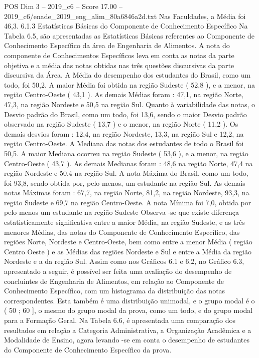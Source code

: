 \begin{textsample}{POS Dim 3 – 2019\_c6 – Score 17.00 – 2019\_c6/enade\_2019\_eng\_alim\_80a6846a2d.txt}
Nas Faculdades, a Média foi 46,3. 6.1.3 Estatísticas Básicas do Componente de Conhecimento Específico Na Tabela 6.5, são apresentadas as Estatísticas Básicas referentes ao Componente de Conhecimento Específico da área de Engenharia de Alimentos.
A nota do componente de Conhecimentos Específicos leva em conta as notas da parte objetiva e a média das notas obtidas nas três questões discursivas da parte discursiva da Área.
A Média do desempenho dos estudantes do Brasil, como um todo, foi 50,2.
A maior Média foi obtida na região Sudeste ( 52,8 ), e a menor, na região Centro-Oeste ( 43,1 ).
As demais Médias foram : 47,1, na região Norte, 47,3, na região Nordeste e 50,5 na região Sul.
Quanto à variabilidade das notas, o Desvio padrão do Brasil, como um todo, foi 13,6, sendo o maior Desvio padrão observado na região Sudeste ( 13,7 ) e o menor, na região Norte ( 11,2 ).
Os demais desvios foram : 12,4, na região Nordeste, 13,3, na região Sul e 12,2, na região Centro-Oeste.
A Mediana das notas dos estudantes de todo o Brasil foi 50,5.
A maior Mediana ocorreu na região Sudeste ( 53,6 ), e a menor, na região Centro-Oeste ( 43,7 ).
As demais Medianas foram : 48,6 na região Norte, 47,4 na região Nordeste e 50,4 na região Sul.
A nota Máxima do Brasil, como um todo, foi 93,8, sendo obtida por, pelo menos, um estudante na região Sul.
As demais notas Máximas foram : 67,7, na região Norte, 81,2, na região Nordeste, 93,3, na região Sudeste e 69,7 na região Centro-Oeste.
A nota Mínima foi 7,0, obtida por pelo menos um estudante na região Sudeste Observa -se que existe diferença estatisticamente significativa entre a maior Média, na região Sudeste, e as três menores Médias, das notas do Componente de Conhecimento Específico, das regiões Norte, Nordeste e Centro-Oeste, bem como entre a menor Média ( região Centro Oeste ) e as Médias das regiões Nordeste e Sul e entre a Média da região Nordeste e a da região Sul.
Assim como nos Gráficos 6.1 e 6.2, no Gráfico 6.3, apresentado a seguir, é possível ser feita uma avaliação do desempenho de concluintes de Engenharia de Alimentos, em relação ao Componente de Conhecimento Específico, com um histograma da distribuição das notas correspondentes.
Esta também é uma distribuição unimodal, e o grupo modal é o ( 50 ; 60 ], o mesmo do grupo modal da prova, como um todo, e do grupo modal para a Formação Geral.
Na Tabela 6.6, é apresentada uma comparação dos resultados em relação a Categoria Administrativa, a Organização Acadêmica e a Modalidade de Ensino, agora levando -se em conta o desempenho de estudantes do Componente de Conhecimento Específico da prova.

\end{textsample}

